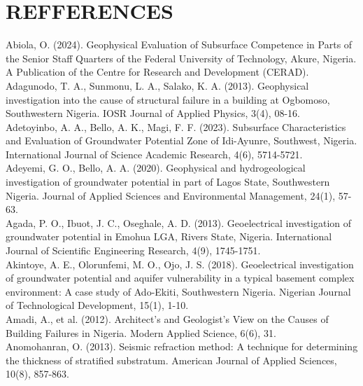 \documentclass[12pt,a4paper]{report}
\begin{document}
\chapter*{REFFERENCES}
\begin{justify}
    Abiola, O. (2024). Geophysical Evaluation of Subsurface Competence in Parts of the Senior Staff Quarters of the Federal University of Technology, Akure, Nigeria. A Publication of the Centre for Research and Development (CERAD). \\

    Adagunodo, T. A., Sunmonu, L. A., Salako, K. A. (2013). Geophysical investigation into the cause of structural failure in a building at Ogbomoso, Southwestern Nigeria. IOSR Journal of Applied Physics, 3(4), 08-16. \\
    
    Adetoyinbo, A. A., Bello, A. K., Magi, F. F. (2023). Subsurface Characteristics and Evaluation of Groundwater Potential Zone of Idi-Ayunre, Southwest, Nigeria. International Journal of Science Academic Research, 4(6), 5714-5721. \\
    
    Adeyemi, G. O., Bello, A. A. (2020). Geophysical and hydrogeological investigation of groundwater potential in part of Lagos State, Southwestern Nigeria. Journal of Applied Sciences and Environmental Management, 24(1), 57-63. \\
    
    Agada, P. O., Ibuot, J. C., Oseghale, A. D. (2013). Geoelectrical investigation of groundwater potential in Emohua LGA, Rivers State, Nigeria. International Journal of Scientific Engineering Research, 4(9), 1745-1751. \\
    
    Akintoye, A. E., Olorunfemi, M. O., Ojo, J. S. (2018). Geoelectrical investigation of groundwater potential and aquifer vulnerability in a typical basement complex environment: A case study of Ado-Ekiti, Southwestern Nigeria. Nigerian Journal of Technological Development, 15(1), 1-10. \\
    
    Amadi, A., et al. (2012). Architect's and Geologist's View on the Causes of Building Failures in Nigeria. Modern Applied Science, 6(6), 31. \\
    
    Anomohanran, O. (2013). Seismic refraction method: A technique for determining the thickness of stratified substratum. American Journal of Applied Sciences, 10(8), 857-863. \\
    

\end{justify}
\end{document}
